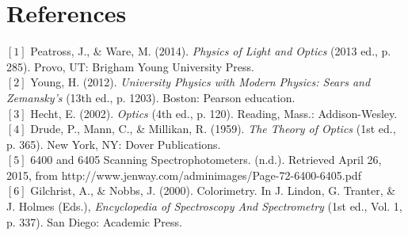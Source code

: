 \documentclass[a4paper,12pt]{report}
\begin{document}
\chapter{References}
$[1]$ Peatross, J., \& Ware, M. (2014). \textit{Physics of Light and Optics} (2013 ed., p. 285). Provo, UT: Brigham Young University Press.\\
$[2]$ Young, H. (2012). \textit{University Physics with Modern Physics: Sears and Zemansky's} (13th ed., p. 1203). Boston: Pearson education.\\
$[3]$ Hecht, E. (2002). \textit{Optics} (4th ed., p. 120). Reading, Mass.: Addison-Wesley.\\
$[4]$ Drude, P., Mann, C., \& Millikan, R. (1959). \textit{The Theory of Optics} (1st ed., p. 365). New York, NY: Dover Publications.\\
$[5]$ 6400 and 6405 Scanning Spectrophotometers. (n.d.). Retrieved April 26, 2015, from http://www.jenway.com/adminimages/Page-72-6400-6405.pdf\\
$[6]$ Gilchrist, A., \& Nobbs, J. (2000). Colorimetry. In J. Lindon, G. Tranter, \& J. Holmes (Eds.), \textit{Encyclopedia of Spectroscopy And Spectrometry} (1st ed., Vol. 1, p. 337). San Diego: Academic Press.
\end{document}
